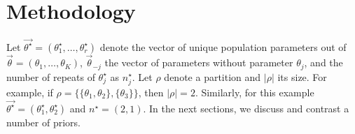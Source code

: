 \documentclass[11pt,a4paper]{article}
\theoremstyle{definition} %
\theoremstyle{case}
\newcommand{\len}{r} %
\newcommand{\partition}{\rho}
\newcommand{\FD}[1]{\textcolor{red}{Fabian: #1 }}
\newcommand{\DB}[1]{\todo[inline, color=orange]{ \textbf{DB}: #1 }}
\begin{document}
\section{Methodology} \label{sec:methodology}
Let $\vec{\theta^{\star}} = (\theta^{\star}_1, \ldots, \theta^{\star}_\len)$ denote the vector of unique population parameters out of $\vec{\theta} = (\theta_1, \ldots, \theta_K)$, $\vec{\theta}_{-j}$ the vector of parameters without parameter $\theta_j$, and the number of repeats of $\theta^{\star}_j$ as $n^{\star}_j$. Let $\rho$ denote a partition and $|\rho|$ its size. For example, if $\rho = \{\{\theta_1, \theta_2\}, \{\theta_3\}\}$, then $|\rho| = 2$. Similarly, for this example $\vec{\theta^{\star}} = (\theta^{\star}_1, \theta^{\star}_2)$ and $n^{\star} = (2, 1)$. In the next sections, we discuss and contrast a number of priors.
\end{document}
